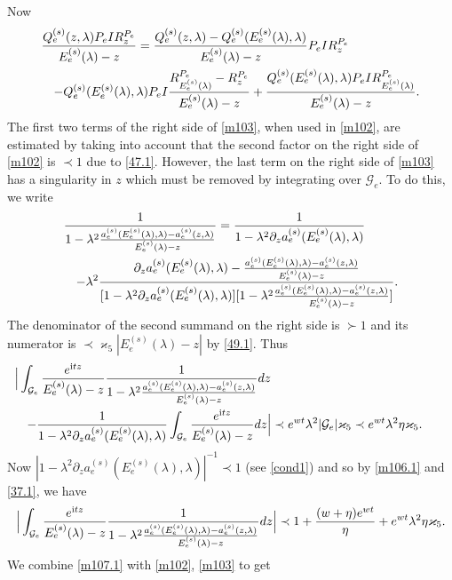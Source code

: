 \documentclass[letterpaper,onecolumn,11pt,accepted=2021-12-09]{quantumarticle}
\numberwithin{equation}{section}
\newcommand{\aes}{a_e^{(s)}}
\newcommand{\Qes}{Q_e^{(s)}}
\newcommand{\Ees}{E_e^{(s)}(\lambda)}
\renewcommand{\i}{{\rm i}}
\begin{document}
Now 
\begin{eqnarray}
\lefteqn{
\frac{\Qes(z,\lambda)P_eIR_z^{P_e}}{\Ees-z} = \frac{\Qes(z,\lambda)-\Qes(\Ees,\lambda)}{\Ees-z} P_eIR_z^{P_e} } \nonumber\\
&&- \Qes(\Ees,\lambda) P_eI \frac{R^{P_e}_{\Ees} - R_z^{P_e}}{\Ees-z} +\frac{\Qes(\Ees,\lambda)P_eIR_{\Ees}^{P_e}}{\Ees-z}.
\label{m103}
\end{eqnarray}
The first two terms of the right side of \eqref{m103}, when used in \eqref{m102}, are estimated by taking into account that the second factor on the right side of \eqref{m102} is $\prec 1$ due to \eqref{47.1}. However, the last term on the right side of \eqref{m103} has a singularity in $z$ which must be removed by integrating over ${\mathcal G}_e$. To do this, we write
\begin{eqnarray*}
	\lefteqn{
\frac{1}{1-\lambda^2\frac{\aes(\Ees,\lambda) - \aes(z,\lambda)}{\Ees -z}} =\frac{1}{1-\lambda^2\partial_z\aes(\Ees,\lambda)} } \nonumber\\
&&-\lambda^2\frac{\partial_z\aes(\Ees,\lambda) - \frac{\aes(\Ees,\lambda) - \aes(z,\lambda)}{\Ees -z}}{ [1-\lambda^2\partial_z\aes(\Ees,\lambda)  ] [ 1-\lambda^2\frac{\aes(\Ees,\lambda) - \aes(z,\lambda)}{\Ees -z}] }.
\end{eqnarray*}
The denominator of the second summand on the right side is $\succ 1$ and its numerator is $\prec\varkappa_5 |\Ees-z|$ by \eqref{49.1}. Thus 
\begin{eqnarray}
	\lefteqn{
\Big| \int_{{\mathcal G}_e} \frac{e^{\i t z}}{\Ees-z}\frac{1}{1-\lambda^2\frac{\aes(\Ees,\lambda) - \aes(z,\lambda)}{\Ees -z}} dz}\label{m106.1}\\
&&  - \frac{1}{1-\lambda^2\partial_z\aes(\Ees,\lambda)}\int_{{\mathcal G}_e} \frac{e^{\i t z}}{\Ees-z}dz\Big| \prec e^{wt}\lambda^2|{\mathcal G}_e| \varkappa_5 \prec e^{wt}\lambda^2\eta\varkappa_5.\qquad 
\nonumber
\end{eqnarray}
Now $|1-\lambda^2\partial_z\aes(\Ees,\lambda)|^{-1}\prec 1$ (see \eqref{cond1}) and so by \eqref{m106.1} and \eqref{37.1}, we have 
\begin{equation}
\Big| \int_{{\mathcal G}_e} \frac{e^{\i t z}}{\Ees-z}\frac{1}{1-\lambda^2\frac{\aes(\Ees,\lambda) - \aes(z,\lambda)}{\Ees -z}} dz\Big| \prec  1+ \frac{(w+\eta) e^{wt}}{\eta}+ e^{wt}\lambda^2\eta\varkappa_5.
\label{m107.1}
\end{equation}
We combine \eqref{m107.1} with \eqref{m102}, \eqref{m103} to get
\end{document}
